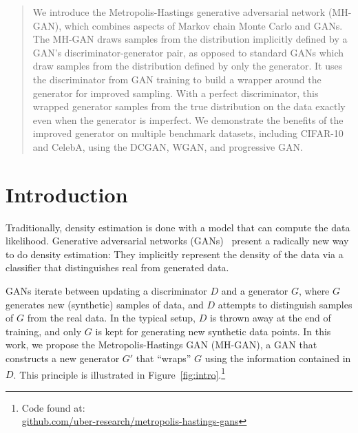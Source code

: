 \documentclass{article}
\begin{document}
\begin{abstract}
We introduce the Metropolis-Hastings generative adversarial network (MH-GAN), which combines aspects of Markov chain Monte Carlo and GANs.
The MH-GAN draws samples from the distribution implicitly defined by a GAN's discriminator-generator pair, as opposed to standard GANs which draw samples from the distribution defined by only the generator.
It uses the discriminator from GAN training to build a wrapper around the generator for improved sampling.
With a perfect discriminator, this wrapped generator samples from the true distribution on the data exactly even when the generator is imperfect.
We demonstrate the benefits of the improved generator on multiple benchmark datasets, including CIFAR-10 and CelebA, using the DCGAN, WGAN, and progressive GAN\@.
\end{abstract}

\section{Introduction}

Traditionally, density estimation is done with a model that can compute the data likelihood.
Generative adversarial networks (GANs)~\citep{Goodfellow2014} present a radically new way to do density estimation:
They implicitly represent the density of the data via a classifier that distinguishes real from generated data.

GANs iterate between updating a discriminator $D$ and a generator $G$, where $G$ generates new (synthetic) samples of data, and $D$ attempts to distinguish samples of $G$ from the real data.
In the typical setup, $D$ is thrown away at the end of training, and only $G$ is kept for generating new synthetic data points.
In this work, we propose the Metropolis-Hastings GAN (MH-GAN), a GAN that constructs a new generator $G'$ that ``wraps'' $G$ using the information contained in $D$.
This principle is illustrated in Figure~\ref{fig:intro}.\footnote{Code found at:\\ \scriptsize{\url{github.com/uber-research/metropolis-hastings-gans}}}
\end{document}
